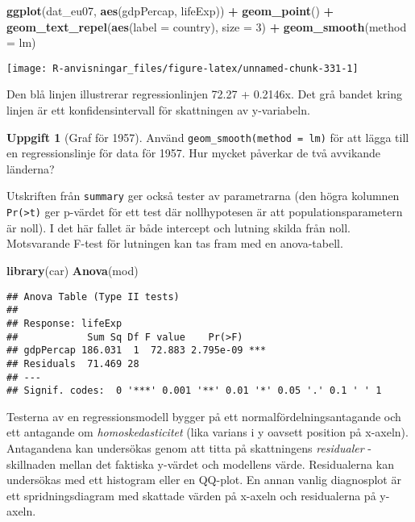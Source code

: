 \documentclass[
]{book}
\newenvironment{Shaded}{\begin{snugshade}}{\end{snugshade}}
\newcommand{\AttributeTok}[1]{\textcolor[rgb]{0.13,0.29,0.53}{#1}}
\newcommand{\DecValTok}[1]{\textcolor[rgb]{0.00,0.00,0.81}{#1}}
\newcommand{\FunctionTok}[1]{\textcolor[rgb]{0.13,0.29,0.53}{\textbf{#1}}}
\newcommand{\NormalTok}[1]{#1}
\newcommand{\SpecialCharTok}[1]{\textcolor[rgb]{0.81,0.36,0.00}{\textbf{#1}}}
\theoremstyle{definition}
\theoremstyle{definition}
\theoremstyle{definition}
\newtheorem{exercise}{Uppgift}[chapter]
\theoremstyle{definition}
\theoremstyle{remark}
\begin{document}
\begin{Shaded}
\begin{Highlighting}[]
\FunctionTok{ggplot}\NormalTok{(dat\_eu07, }\FunctionTok{aes}\NormalTok{(gdpPercap, lifeExp)) }\SpecialCharTok{+}
  \FunctionTok{geom\_point}\NormalTok{() }\SpecialCharTok{+}
  \FunctionTok{geom\_text\_repel}\NormalTok{(}\FunctionTok{aes}\NormalTok{(}\AttributeTok{label =}\NormalTok{ country), }\AttributeTok{size =} \DecValTok{3}\NormalTok{) }\SpecialCharTok{+}
  \FunctionTok{geom\_smooth}\NormalTok{(}\AttributeTok{method =}\NormalTok{ lm)}
\end{Highlighting}
\end{Shaded}

\begin{center}\texttt{[image: R-anvisningar\_files/figure-latex/unnamed-chunk-331-1]} \end{center}

Den blå linjen illustrerar regressionlinjen 72.27 + 0.2146x. Det grå bandet kring linjen är ett konfidensintervall för skattningen av y-variabeln.

\begin{exercise}[Graf för 1957]
Använd \texttt{geom\_smooth(method\ =\ lm)} för att lägga till en regressionslinje för data för 1957. Hur mycket påverkar de två avvikande länderna?
\end{exercise}

Utskriften från \texttt{summary} ger också tester av parametrarna (den högra kolumnen \texttt{Pr(\textgreater{}\textbar{}t\textbar{})} ger p-värdet för ett test där nollhypotesen är att populationsparametern är noll). I det här fallet är både intercept och lutning skilda från noll. Motsvarande F-test för lutningen kan tas fram med en anova-tabell.

\begin{Shaded}
\begin{Highlighting}[]
\FunctionTok{library}\NormalTok{(car)}
\FunctionTok{Anova}\NormalTok{(mod)}
\end{Highlighting}
\end{Shaded}

\begin{verbatim}
## Anova Table (Type II tests)
## 
## Response: lifeExp
##            Sum Sq Df F value    Pr(>F)    
## gdpPercap 186.031  1  72.883 2.795e-09 ***
## Residuals  71.469 28                      
## ---
## Signif. codes:  0 '***' 0.001 '**' 0.01 '*' 0.05 '.' 0.1 ' ' 1
\end{verbatim}

Testerna av en regressionsmodell bygger på ett normalfördelningsantagande och ett antagande om \emph{homoskedasticitet} (lika varians i y oavsett position på x-axeln). Antagandena kan undersökas genom att titta på skattningens \emph{residualer} - skillnaden mellan det faktiska y-värdet och modellens värde. Residualerna kan undersökas med ett histogram eller en QQ-plot. En annan vanlig diagnosplot är ett spridningsdiagram med skattade värden på x-axeln och residualerna på y-axeln.
\end{document}

